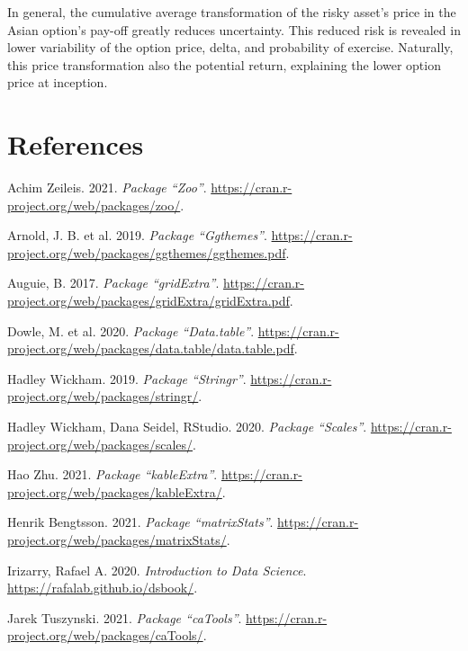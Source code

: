 \documentclass[
  12pt,
]{article}
\begin{document}
In general, the cumulative average transformation of the risky asset's
price in the Asian option's pay-off greatly reduces uncertainty. This
reduced risk is revealed in lower variability of the option price,
delta, and probability of exercise. Naturally, this price transformation
also the potential return, explaining the lower option price at
inception.

\newpage

\hypertarget{references}{%
\section*{References}\label{references}}

\hypertarget{refs}{}
\leavevmode\hypertarget{ref-zoo}{}%
Achim Zeileis. 2021. \emph{Package ``Zoo''}.
\url{https://cran.r-project.org/web/packages/zoo/}.

\leavevmode\hypertarget{ref-ggthemes}{}%
Arnold, J. B. et al. 2019. \emph{Package ``Ggthemes''}.
\url{https://cran.r-project.org/web/packages/ggthemes/ggthemes.pdf}.

\leavevmode\hypertarget{ref-gridExtra}{}%
Auguie, B. 2017. \emph{Package ``gridExtra''}.
\url{https://cran.r-project.org/web/packages/gridExtra/gridExtra.pdf}.

\leavevmode\hypertarget{ref-dt}{}%
Dowle, M. et al. 2020. \emph{Package ``Data.table''}.
\url{https://cran.r-project.org/web/packages/data.table/data.table.pdf}.

\leavevmode\hypertarget{ref-stringr}{}%
Hadley Wickham. 2019. \emph{Package ``Stringr''}.
\url{https://cran.r-project.org/web/packages/stringr/}.

\leavevmode\hypertarget{ref-scales}{}%
Hadley Wickham, Dana Seidel, RStudio. 2020. \emph{Package ``Scales''}.
\url{https://cran.r-project.org/web/packages/scales/}.

\leavevmode\hypertarget{ref-kableExtra}{}%
Hao Zhu. 2021. \emph{Package ``kableExtra''}.
\url{https://cran.r-project.org/web/packages/kableExtra/}.

\leavevmode\hypertarget{ref-matrixStats}{}%
Henrik Bengtsson. 2021. \emph{Package ``matrixStats''}.
\url{https://cran.r-project.org/web/packages/matrixStats/}.

\leavevmode\hypertarget{ref-iriz}{}%
Irizarry, Rafael A. 2020. \emph{Introduction to Data Science}.
\url{https://rafalab.github.io/dsbook/}.

\leavevmode\hypertarget{ref-caTools}{}%
Jarek Tuszynski. 2021. \emph{Package ``caTools''}.
\url{https://cran.r-project.org/web/packages/caTools/}.
\end{document}
